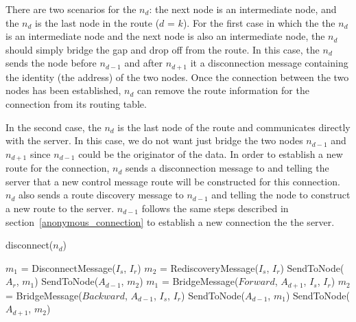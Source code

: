 There are two scenarios for the $n_d$: the next node is an intermediate node,
and the $n_d$ is the last node in the route ($d$ = $k$).
For the first case in which the the $n_d$ is an intermediate node and the
next node is also an intermediate node, the $n_d$ should simply bridge the
gap and drop off from the route. In this case, the $n_d$ sends the node before
$n_{d-1}$
and after $n_{d+1}$
it a disconnection message containing the identity (the address)
of the two nodes. Once the connection between the two nodes has been
established, $n_d$ can remove the route information for the connection
from its routing table.

In the second case, the $n_d$ is the last node of the route and
communicates directly with the server. In this case, we do not want
just bridge the two nodes $n_{d-1}$ and $n_{d+1}$ since $n_{d-1}$
could be the originator of the data. In order to establish a new route
for the connection, $n_d$ sends a disconnection message to and telling
the server that a new control message route will be constructed for this
connection. $n_d$ also sends a route discovery message to $n_{d-1}$
and telling the node to construct a new route to the server. $n_{d-1}$
follows the same steps described in section~\ref{anonymous_connection}
to establish a new connection the the server.

\begin{algorithm}
\caption{disconnect($n_d$)} \label{alg:PBSkyline}
\begin{algorithmic}[1]
    \STATE $m_1$ = DisconnectMessage($I_s$, $I_r$)
    \STATE $m_2$ = RediscoveryMessage($I_s$, $I_r$)
    \STATE SendToNode($A_r$, $m_1$)
    \STATE SendToNode($A_{d-1}$, $m_2$)
\ELSE
    \STATE $m_1$ = BridgeMessage($Forward$, $A_{d+1}$, $I_s$, $I_r$)
    \STATE $m_2$ = BridgeMessage($Backward$, $A_{d-1}$, $I_s$, $I_r$)
    \STATE SendToNode($A_{d-1}$, $m_1$)
    \STATE SendToNode($A_{d+1}$, $m_2$)
\ENDIF
\end{algorithmic}
\end{algorithm}

